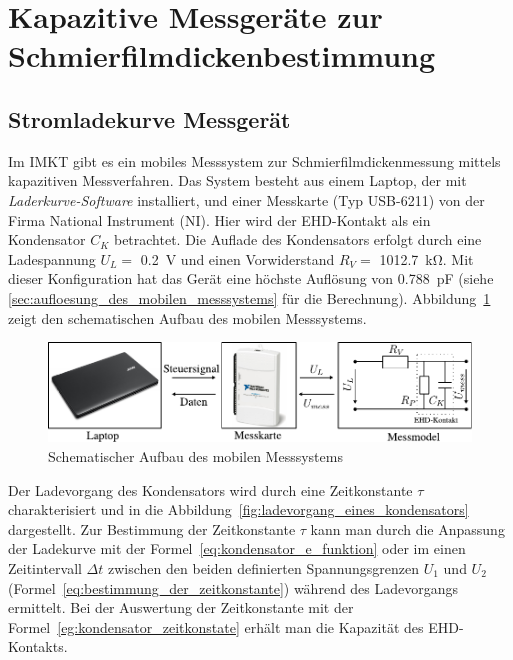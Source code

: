 \section{Kapazitive Messgeräte zur Schmierfilmdickenbestimmung}
\label{sec:kapazitive_messgeraete_zur_schmierfilmdickenbestimmung}

\subsection{Stromladekurve Messgerät}
\label{sub:stromladekurve_messgeraet}

Im IMKT gibt es ein mobiles Messsystem zur Schmierfilmdickenmessung mittels kapazitiven Messverfahren.
Das System besteht aus einem Laptop, der mit \textit{Laderkurve-Software} installiert, und einer Messkarte (Typ USB-6211) von der Firma National Instrument (NI).
Hier wird der EHD-Kontakt als ein Kondensator $C_K$ betrachtet.
Die Auflade des Kondensators erfolgt durch eine Ladespannung $U_L =$ \SI{0,2}{\volt} und einen Vorwiderstand $R_V =$ \SI{1012.7}{\kilo\ohm}.
Mit dieser Konfiguration hat das Gerät eine höchste Auflösung von \SI{0.788}{\pico\farad} (siehe \ref{sec:aufloesung_des_mobilen_messsystems} für die Berechnung).
Abbildung~\ref{fig:schematischer_aufbau_des_mobilen_messsystems} zeigt den schematischen Aufbau des mobilen Messsystems.
\begin{figure}[htb]
    \centering
    \includegraphics[]{./images/schematischer_aufbau_des_mobilen_messsystem.pdf}
    \caption{Schematischer Aufbau des mobilen Messsystems}
    \label{fig:schematischer_aufbau_des_mobilen_messsystems}
\end{figure}

Der Ladevorgang des Kondensators wird durch eine Zeitkonstante $\tau$ charakterisiert und in die Abbildung~\ref{fig:ladevorgang_eines_kondensators} dargestellt.
Zur Bestimmung der Zeitkonstante $\tau$ kann man durch die Anpassung der Ladekurve mit der Formel~\ref{eq:kondensator_e_funktion} oder im einen Zeitintervall $\Delta t$ zwischen den beiden definierten Spannungsgrenzen $U_1$ und $U_2$ (Formel~\ref{eq:bestimmung_der_zeitkonstante}) während des Ladevorgangs ermittelt.
Bei der Auswertung der Zeitkonstante mit der Formel~\ref{eg:kondensator_zeitkonstate} erhält man die Kapazität des EHD-Kontakts.

